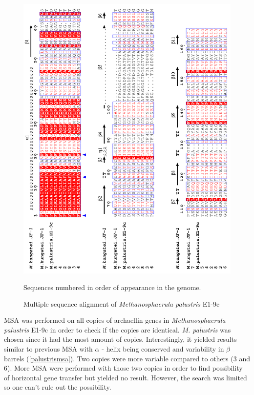 \documentclass[fontsize=12pt,headsepline=true, bibliography=totocnumbered, twoside]{scrbook} %
\begin{document}
\begin{figure}
\center
\includegraphics[scale=0.9]{alignment3}
\caption[Multiple sequence alignment of \textit{Methanosphaerula palustris}]{Multiple sequence alignment of \textit{Methanosphaerula palustris} E1-9c }
Sequences numbered in order of appearance in the genome.
\label{palustrismsa}
\end{figure}




\ac{MSA} was performed on all copies of archaellin genes in \textit{Methanosphaerula palustris} E1-9c in order to check if the copies are identical. \textit{M. palustris} was chosen since it had the most amount of copies. Interestingly, it yielded results similar to previous \ac{MSA} with $\alpha$ - helix being conserved and variability in $\beta$ barrels (\autoref{palustrismsa}). Two copies were more variable compared to others (3 and 6). More \ac{MSA} were performed with those two copies in order to find possibility of horizontal gene transfer but yielded no result. However, the search was limited so one can't rule out the possibility.
\end{document}
